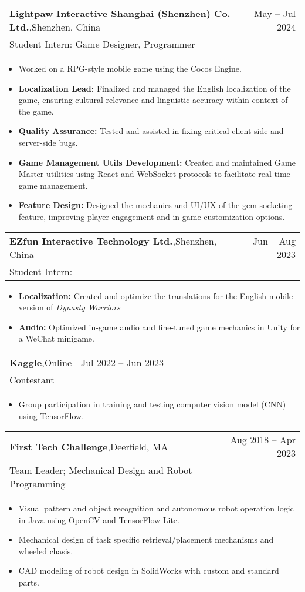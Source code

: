 \documentclass[oneside, 11pt]{article}
\newcommand*{\experienceEntry}[4]{
	\noindent
	\begin{tabularx}{\textwidth}{Xr}
	\textbf{#1},\quad #2 & #3\\
	#4
	\end{tabularx}
	\vspace{-0.75\baselineskip}
}
\newenvironment{expD}
	{\begin{itemize}[noitemsep,topsep=0pt]}
	{\end{itemize}}
\begin{document}
\experienceEntry{Lightpaw Interactive Shanghai (Shenzhen) Co. Ltd.}
	{Shenzhen, China}
	{May -- Jul 2024}
	{Student Intern: Game Designer, Programmer}

\begin{expD}
	\item Worked on a RPG-style mobile game using the Cocos Engine.
	\item \textbf{Localization Lead:} Finalized and managed the English localization of the game, ensuring cultural relevance and linguistic accuracy within context of the game.
	\item \textbf{Quality Assurance:} Tested and assisted in fixing critical client-side and server-side bugs.
	\item \textbf{Game Management Utils Development:} Created and maintained Game Master utilities using React and WebSocket protocols to facilitate real-time game management.
	\item \textbf{Feature Design:} Designed the mechanics and UI/UX of the gem socketing feature, improving player engagement and in-game customization options.
\end{expD}

\experienceEntry{EZfun Interactive Technology Ltd.}
	{Shenzhen, China}
	{Jun -- Aug 2023}
	{Student Intern: }

\begin{expD}
	\item \textbf{Localization:} Created and optimize the translations for the English mobile version of \textit{Dynasty Warriors}
	\item \textbf{Audio:} Optimized in-game audio and fine-tuned game mechanics in Unity for a WeChat minigame.
\end{expD}

\experienceEntry{Kaggle}
	{Online}
	{Jul 2022 -- Jun 2023}
	{Contestant}

\begin{expD}
	\item Group participation in training and testing computer vision model (CNN) using TensorFlow.
\end{expD}

\experienceEntry{First Tech Challenge}
	{Deerfield, MA}
	{Aug 2018 -- Apr 2023}
	{Team Leader; Mechanical Design and Robot Programming}

\begin{expD}
	\item Visual pattern and object recognition and autonomous robot operation logic in Java using OpenCV and TensorFlow Lite.
	\item Mechanical design of task specific retrieval/placement mechanisms and wheeled chasis.
	\item CAD modeling of robot design in SolidWorks with custom and standard parts.
\end{expD}
\end{document}
